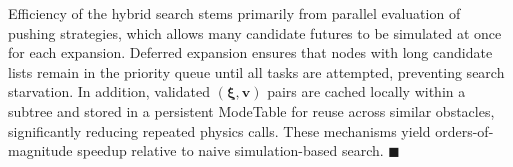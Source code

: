 \begin{remark}\label{remark:simloop}
Efficiency of the hybrid search stems primarily from parallel evaluation of
pushing strategies, which allows many candidate futures to be simulated at once
for each expansion. Deferred expansion ensures that nodes with long candidate
lists remain in the priority queue until all tasks are attempted, preventing
search starvation. In addition, validated $(\boldsymbol{\xi},\mathbf{v})$ pairs
are cached locally within a subtree and stored in a persistent ModeTable for
reuse across similar obstacles, significantly reducing repeated physics calls.
These mechanisms yield orders-of-magnitude speedup relative to naive
simulation-based search. \hfill$\blacksquare$
\end{remark}
